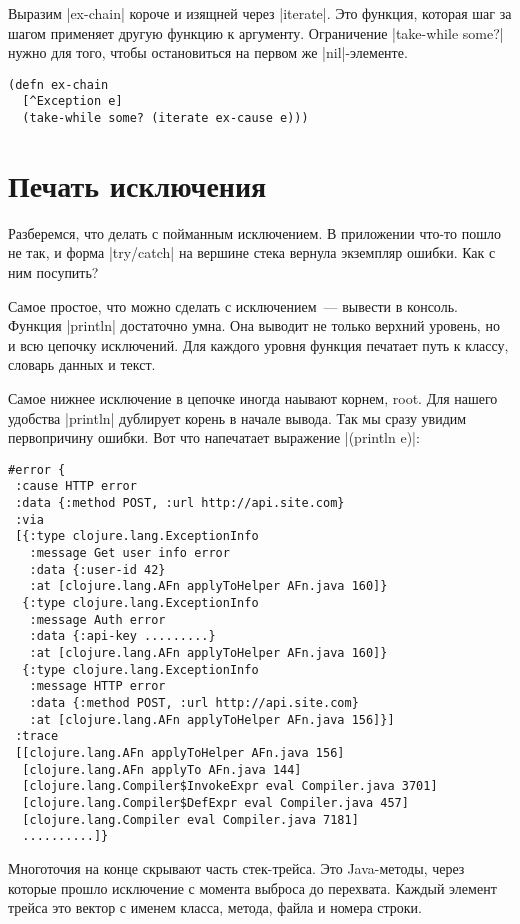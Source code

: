 Выразим \spverb|ex-chain| короче и изящней через \spverb|iterate|. Это функция, которая шаг за
шагом применяет другую функцию к аргументу. Ограничение \spverb|take-while some?| нужно
для того, чтобы остановиться на первом же \spverb|nil|-элементе.

\begin{verbatim}
(defn ex-chain
  [^Exception e]
  (take-while some? (iterate ex-cause e)))
\end{verbatim}

\section{Печать исключения}

Разберемся, что делать с пойманным исключением. В приложении что-то пошло не
так, и форма \spverb|try/catch| на вершине стека вернула экземпляр ошибки. Как с ним
посупить?

Самое простое, что можно сделать с исключением~--- вывести в консоль. Функция
\spverb|println| достаточно умна. Она выводит не только верхний уровень, но и всю
цепочку исключений. Для каждого уровня функция печатает путь к классу, словарь
данных и текст.

Самое нижнее исключение в цепочке иногда наывают корнем, root. Для нашего
удобства \spverb|println| дублирует корень в начале вывода. Так мы сразу увидим
первопричину ошибки. Вот что напечатает выражение \spverb|(println e)|:

\begin{verbatim}
#error {
 :cause HTTP error
 :data {:method POST, :url http://api.site.com}
 :via
 [{:type clojure.lang.ExceptionInfo
   :message Get user info error
   :data {:user-id 42}
   :at [clojure.lang.AFn applyToHelper AFn.java 160]}
  {:type clojure.lang.ExceptionInfo
   :message Auth error
   :data {:api-key .........}
   :at [clojure.lang.AFn applyToHelper AFn.java 160]}
  {:type clojure.lang.ExceptionInfo
   :message HTTP error
   :data {:method POST, :url http://api.site.com}
   :at [clojure.lang.AFn applyToHelper AFn.java 156]}]
 :trace
 [[clojure.lang.AFn applyToHelper AFn.java 156]
  [clojure.lang.AFn applyTo AFn.java 144]
  [clojure.lang.Compiler$InvokeExpr eval Compiler.java 3701]
  [clojure.lang.Compiler$DefExpr eval Compiler.java 457]
  [clojure.lang.Compiler eval Compiler.java 7181]
  ..........]}
\end{verbatim}

Многоточия на конце скрывают часть стек-трейса. Это Java-методы, через которые
прошло исключение с момента выброса до перехвата. Каждый элемент трейса это
вектор с именем класса, метода, файла и номера строки.

